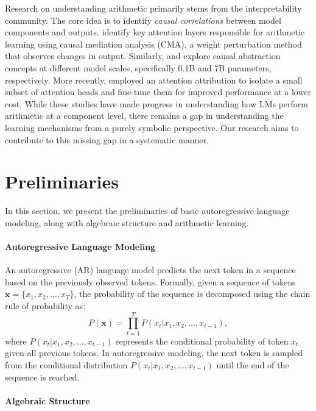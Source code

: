 \documentclass[11pt]{article}
\begin{document}
Research on understanding arithmetic primarily stems from the interpretability community. The core idea is to identify \textit{causal correlations} between model components and outputs. \citet{stolfo-etal-2023-mechanistic} identify key attention layers responsible for arithmetic learning using causal mediation analysis (CMA), a weight perturbation method that observes changes in output. Similarly, \citet{hanna2023doesgpt2computegreaterthan} and \citet{wu2024interpretabilityscaleidentifyingcausal} explore causal abstraction concepts at different model scales, specifically 0.1B and 7B parameters, respectively. More recently, \citet{zhang2024interpretingimprovinglargelanguage} employed an attention attribution to isolate a small subset of attention heads and fine-tune them for improved performance at a lower cost. While these studies have made progress in understanding how LMs perform arithmetic at a component level, there remains a gap in understanding the learning mechanisms from a purely symbolic perspective. Our research aims to contribute to this missing gap in a systematic manner.

\section{Preliminaries}
\label{sec:preliminaries}
In this section, we present the preliminaries of basic autoregressive language modeling, along with algebraic structure and arithmetic learning.

\paragraph{Autoregressive Language Modeling}
An autoregressive (AR) language model predicts the next token in a sequence based on the previously observed tokens. Formally, given a sequence of tokens $\mathbf{x} = \{x_1, x_2, \dots, x_T\}$, the probability of the sequence is decomposed using the chain rule of probability as:
\begin{equation}
    P(\mathbf{x}) = \prod_{t=1}^{T} P(x_t | x_1, x_2, \dots, x_{t-1}),
\end{equation}
where $P(x_t | x_1, x_2, \dots, x_{t-1})$ represents the conditional probability of token $x_t$ given all previous tokens. In autoregressive modeling, the next token is sampled from the conditional distribution $P(x_t | x_1, x_2, \dots, x_{t-1})$ until the end of the sequence is reached.

\paragraph{Algebraic Structure}
\end{document}
